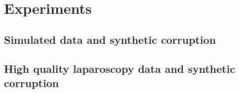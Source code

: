 \chapter{Experiments}

\section{Simulated data and synthetic corruption}

\section{High quality laparoscopy data and synthetic corruption}
